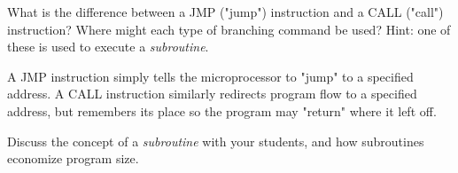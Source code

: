 

What is the difference between a JMP ("jump") instruction and a CALL ("call") instruction?  Where might each type of branching command be used?  Hint: one of these is used to execute a {\it subroutine}.







A JMP instruction simply tells the microprocessor to "jump" to a specified address.  A CALL instruction similarly redirects program flow to a specified address, but remembers its place so the program may "return" where it left off.







Discuss the concept of a {\it subroutine} with your students, and how subroutines economize program size.




